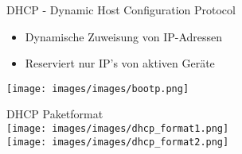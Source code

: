 \columnbreak

\begin{definition}{DHCP - Dynamic Host Configuration Protocol}
    \begin{itemize}
        \item Dynamische Zuweisung von IP-Adressen
        \item Reserviert nur IP’s von aktiven Geräte
    \end{itemize}
    \texttt{[image: images/images/bootp.png]}
\end{definition}

\begin{definition}{DHCP Paketformat}\\
    \texttt{[image: images/images/dhcp\_format1.png]}\\
    \texttt{[image: images/images/dhcp\_format2.png]}
\end{definition}






